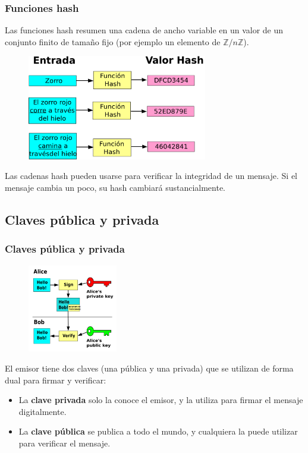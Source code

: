 \documentclass{beamer}
\begin{document}
\begin{frame}
    \frametitle{Funciones hash}

    Las funciones hash \alert{resumen} una cadena de ancho variable en un valor de un conjunto finito de tamaño fijo (por ejemplo un elemento de $\mathbb{Z}/n\mathbb{Z}$).

    \begin{figure}
        \centering
        \includegraphics[width=0.7\textwidth]{Hash.png}
    \end{figure}


    Las cadenas hash pueden usarse para verificar la integridad de un mensaje. Si el mensaje cambia un poco, su hash cambiará sustancialmente.
\end{frame}

\subsection{Claves pública y privada}

\begin{frame}
    \frametitle{Claves pública y privada}

    \begin{figure}
        \centering
        \includegraphics[width=0.35\textwidth]{PrivateKeySign.png}
    \end{figure}

    El emisor tiene dos claves (una pública y una privada) que se utilizan de forma dual para firmar y verificar:

    \begin{itemize}
        \item La \textbf{clave privada} solo la conoce el emisor, y la utiliza para firmar el mensaje digitalmente.
        \item La \textbf{clave pública} se publica a todo el mundo, y cualquiera la puede utilizar para verificar el mensaje.
    \end{itemize}
    

\end{frame}
\end{document}
